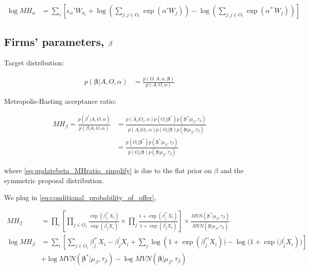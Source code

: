 \begin{align}
\log MH_\alpha &= \sum_i \left[ \epsilon_\alpha' W_{a_i} + \log\left(\sum\limits_{j:j \in O_i} \exp(\alpha' W_j)\right) - \log\left(\sum\limits_{j:j \in O_i} \exp(\alpha^{*\prime} W_j)\right) \right]
\end{align}

\subsection{Firms' parameters, \texorpdfstring{$\boldmath\beta$}{}}

Target distribution:

\begin{align}
p(\bm{\beta}|A, O, \alpha) &= \frac{p(O, A, \alpha, \bm{\beta})}{p(A, O, \alpha)}
\end{align}

Metropolis-Hasting acceptance ratio:

\begin{align}
MH_\beta = \frac{p(\beta^* | A, O, \alpha)}{p(\beta | A, O, \alpha)} &= \frac{p(A_i | O_i, \alpha)p(O_i|\bm{\beta}^*)p(\bm{\beta}^*|\mu_{\beta}, \tau_{\beta})}{p(A_i | O_i, \alpha)p(O_i|\bm{\beta})p(\bm{\beta}|\mu_{\beta}, \tau_{\beta})} \label{eq:updatebeta_MHratio_simplify} \\
&= \frac{p(O_i|\bm{\beta}^*)p(\bm{\beta}^*|\mu_{\beta}, \tau_{\beta})}{p(O_i|\bm{\beta})p(\bm{\beta}|\mu_{\beta}, \tau_{\beta})} \label{eq:updatebeta_MHratio_final}
\end{align}

where \eqref{eq:updatebeta_MHratio_simplify} is due to the flat prior on $\beta$ and the symmetric proposal distribution.

We plug in \eqref{eq:conditional_probability_of_offer},

\begin{align}
MH_\beta &= \prod_i \left[ \prod\limits_{j \in O_i}\frac{ \exp(\beta_j^{*\prime}X_i)}{ \exp(\beta_j^{\prime}X_i)} \times \prod\limits_{j}\frac{1 + \exp(\beta_j^{*\prime}X_i)}{1 + \exp(\beta_j^{\prime}X_i)} \right] \times \frac{MVN(\bm{\beta}^*|\mu_{\beta}, \tau_{\beta})}{MVN(\bm{\beta}|\mu_{\beta}, \tau_{\beta})} \\
  \log MH_\beta &= \sum_i \left[ \sum_{j \in O_i} \beta_j^{*\prime}X_i - \beta_j^{\prime}X_i + \sum_{j} \log(1 + {\exp({\beta_j^{*\prime}X_i})) - \log(1 +  \exp(\beta_j^{\prime}X_i})) \right] \\
 & + \log MVN(\bm{\beta}^*|\mu_{\beta}, \tau_{\beta}) - \log MVN(\bm{\beta}|\mu_{\beta}, \tau_{\beta}) \nonumber
\end{align}
